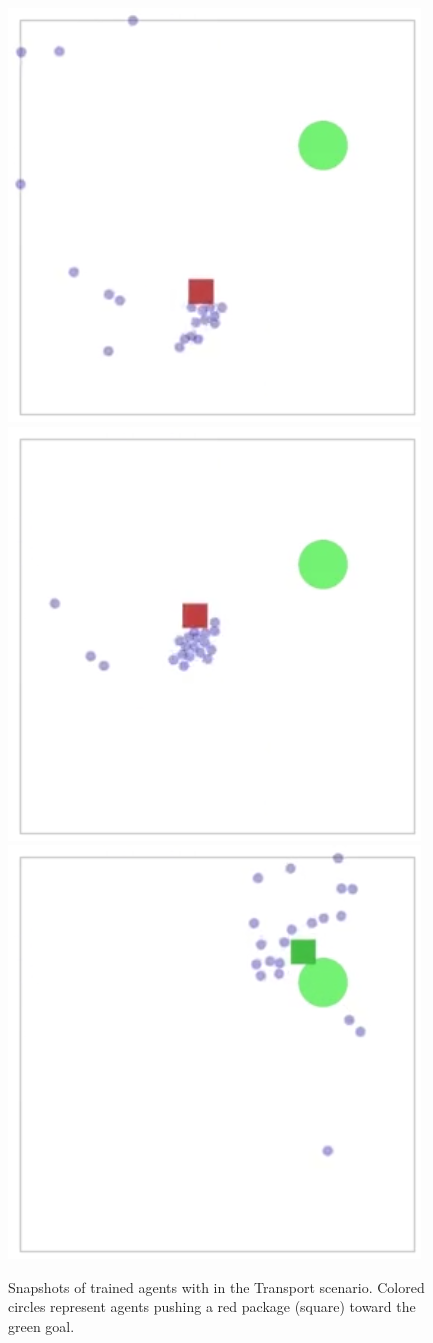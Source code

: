 \begin{figure}
    \centering
    \includegraphics[width=0.32\columnwidth]{figs/step-1.png}
    \includegraphics[width=0.32\columnwidth]{figs/step-2.png}
    \includegraphics[width=0.32\columnwidth]{figs/step-3.png}
    \caption{Snapshots of trained agents with \fname{} in the Transport scenario. Colored circles represent agents pushing a red package (square) toward the green goal.}\label{fig:transport-trained}
\end{figure}

